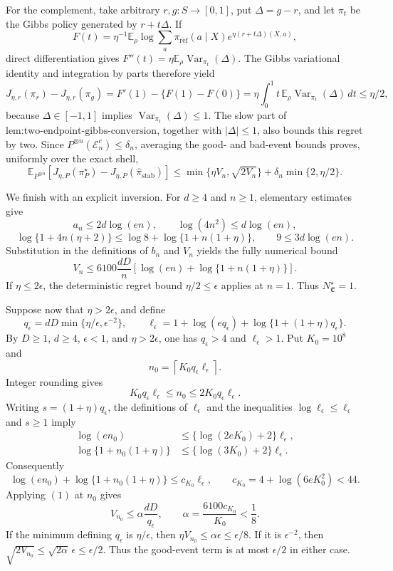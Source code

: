 For the complement, take arbitrary \(r,g:S\to[0,1]\), put \(\Delta=g-r\), and let \(\pi_t\) be the Gibbs policy generated by \(r+t\Delta\). If
\[
F(t)=\eta^{-1}\mathbb E_\rho\log\sum_a\pi_{\mathrm{ref}}(a\mid X)e^{\eta(r+t\Delta)(X,a)},
\]
direct differentiation gives \(F''(t)=\eta\mathbb E_\rho\operatorname{Var}_{\pi_t}(\Delta)\). The Gibbs variational identity and integration by parts therefore yield
\[
J_{\eta,r}(\pi_r)-J_{\eta,r}(\pi_g)
=F'(1)-\{F(1)-F(0)\}
=\eta\int_0^1t\,\mathbb E_\rho\operatorname{Var}_{\pi_t}(\Delta)\,dt
\le\eta/2,
\]
because \(\Delta\in[-1,1]\) implies \(\operatorname{Var}_{\pi_t}(\Delta)\le1\). The slow part of \(\text{lem:two-endpoint-gibbs-conversion}\), together with \(|\Delta|\le1\), also bounds this regret by two. Since \(P^{\otimes n}(\mathcal E_n^c)\le\delta_n\), averaging the good- and bad-event bounds proves, uniformly over the exact shell,
\[
\mathbb E_{P^{\otimes n}}\left[J_{\eta,P}(\pi_P^\star)-J_{\eta,P}(\widehat\pi_{\mathrm{stab}})\right]
\le\min\{\eta V_n,\sqrt{2V_n}\}
+\delta_n\min\{2,\eta/2\}.
\]

We finish with an explicit inversion. For \(d\ge4\) and \(n\ge1\), elementary estimates give
\[
a_n\le2d\log(en),
\qquad
\log(4n^2)\le d\log(en),
\]
\[
\log\{1+4n(\eta+2)\}
\le\log8+\log\{1+n(1+\eta)\},
\qquad
9\le3d\log(en).
\]
Substitution in the definitions of \(b_n\) and \(V_n\) yields the fully numerical bound
\[
V_n
\le6100\frac{dD}{n}
\left[\log(en)+\log\{1+n(1+\eta)\}\right].
\tag{1}
\]
If \(\eta\le2\epsilon\), the deterministic regret bound \(\eta/2\le\epsilon\) applies at \(n=1\). Thus \(N^\star_{\mathfrak E}=1\).

Suppose now that \(\eta>2\epsilon\), and define
\[
q_\epsilon=dD\min\{\eta/\epsilon,\epsilon^{-2}\},
\qquad
\ell_\epsilon=1+\log(eq_\epsilon)+\log\{1+(1+\eta)q_\epsilon\}.
\]
By \(D\ge1\), \(d\ge4\), \(\epsilon<1\), and \(\eta>2\epsilon\), one has \(q_\epsilon>4\) and \(\ell_\epsilon>1\). Put \(K_0=10^8\) and
\[
n_0=\left\lceil K_0q_\epsilon\ell_\epsilon\right\rceil.
\]
Integer rounding gives
\[
K_0q_\epsilon\ell_\epsilon\le n_0\le2K_0q_\epsilon\ell_\epsilon.
\]
Writing \(s=(1+\eta)q_\epsilon\), the definitions of \(\ell_\epsilon\) and the inequalities \(\log\ell_\epsilon\le\ell_\epsilon\) and \(s\ge1\) imply
\[
\begin{aligned}
\log(en_0)
&\le\{\log(2eK_0)+2\}\ell_\epsilon,\\
\log\{1+n_0(1+\eta)\}
&\le\{\log(3K_0)+2\}\ell_\epsilon.
\end{aligned}
\]
Consequently
\[
\log(en_0)+\log\{1+n_0(1+\eta)\}
\le c_{K_0}\ell_\epsilon,
\qquad
c_{K_0}=4+\log(6eK_0^2)<44.
\]
Applying \((1)\) at \(n_0\) gives
\[
V_{n_0}\le\alpha\frac{dD}{q_\epsilon},
\qquad
\alpha=\frac{6100c_{K_0}}{K_0}<\frac18.
\]
If the minimum defining \(q_\epsilon\) is \(\eta/\epsilon\), then \(\eta V_{n_0}\le\alpha\epsilon\le\epsilon/8\). If it is \(\epsilon^{-2}\), then \(\sqrt{2V_{n_0}}\le\sqrt{2\alpha}\,\epsilon\le\epsilon/2\). Thus the good-event term is at most \(\epsilon/2\) in either case.

